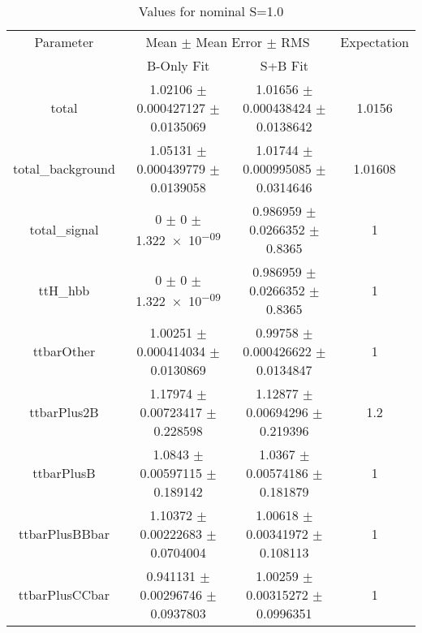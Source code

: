 \begin{table}
\centering
\caption{Values for nominal S=1.0}
\begin{tabular}{cccc}
\toprule
Parameter & \multicolumn{2}{c}{Mean $\pm$ Mean Error $\pm$ RMS} & Expectation\\
 & B-Only Fit & S+B Fit & \\
\midrule
total & \num{1.02106} $\pm$ \num{0.000427127} $\pm$ \num{0.0135069} & \num{1.01656} $\pm$ \num{0.000438424} $\pm$ \num{0.0138642} & \num{1.0156}\\
total\_background & \num{1.05131} $\pm$ \num{0.000439779} $\pm$ \num{0.0139058} & \num{1.01744} $\pm$ \num{0.000995085} $\pm$ \num{0.0314646} & \num{1.01608}\\
total\_signal & \num{0} $\pm$ \num{0} $\pm$ \num{1.322e-09} & \num{0.986959} $\pm$ \num{0.0266352} $\pm$ \num{0.8365} & \num{1}\\
ttH\_hbb & \num{0} $\pm$ \num{0} $\pm$ \num{1.322e-09} & \num{0.986959} $\pm$ \num{0.0266352} $\pm$ \num{0.8365} & \num{1}\\
ttbarOther & \num{1.00251} $\pm$ \num{0.000414034} $\pm$ \num{0.0130869} & \num{0.99758} $\pm$ \num{0.000426622} $\pm$ \num{0.0134847} & \num{1}\\
ttbarPlus2B & \num{1.17974} $\pm$ \num{0.00723417} $\pm$ \num{0.228598} & \num{1.12877} $\pm$ \num{0.00694296} $\pm$ \num{0.219396} & \num{1.2}\\
ttbarPlusB & \num{1.0843} $\pm$ \num{0.00597115} $\pm$ \num{0.189142} & \num{1.0367} $\pm$ \num{0.00574186} $\pm$ \num{0.181879} & \num{1}\\
ttbarPlusBBbar & \num{1.10372} $\pm$ \num{0.00222683} $\pm$ \num{0.0704004} & \num{1.00618} $\pm$ \num{0.00341972} $\pm$ \num{0.108113} & \num{1}\\
ttbarPlusCCbar & \num{0.941131} $\pm$ \num{0.00296746} $\pm$ \num{0.0937803} & \num{1.00259} $\pm$ \num{0.00315272} $\pm$ \num{0.0996351} & \num{1}\\
\bottomrule
\end{tabular}
\end{table}